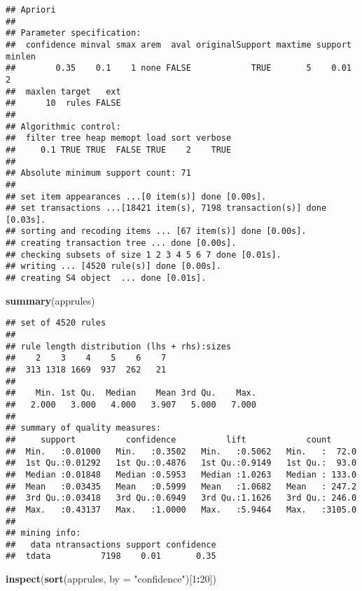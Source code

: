 \documentclass[]{article}
\newenvironment{Shaded}{\begin{snugshade}}{\end{snugshade}}
\newcommand{\KeywordTok}[1]{\textcolor[rgb]{0.13,0.29,0.53}{\textbf{#1}}}
\newcommand{\DataTypeTok}[1]{\textcolor[rgb]{0.13,0.29,0.53}{#1}}
\newcommand{\DecValTok}[1]{\textcolor[rgb]{0.00,0.00,0.81}{#1}}
\newcommand{\StringTok}[1]{\textcolor[rgb]{0.31,0.60,0.02}{#1}}
\newcommand{\OperatorTok}[1]{\textcolor[rgb]{0.81,0.36,0.00}{\textbf{#1}}}
\newcommand{\NormalTok}[1]{#1}
\begin{document}
\begin{verbatim}
## Apriori
## 
## Parameter specification:
##  confidence minval smax arem  aval originalSupport maxtime support minlen
##        0.35    0.1    1 none FALSE            TRUE       5    0.01      2
##  maxlen target   ext
##      10  rules FALSE
## 
## Algorithmic control:
##  filter tree heap memopt load sort verbose
##     0.1 TRUE TRUE  FALSE TRUE    2    TRUE
## 
## Absolute minimum support count: 71 
## 
## set item appearances ...[0 item(s)] done [0.00s].
## set transactions ...[18421 item(s), 7198 transaction(s)] done [0.03s].
## sorting and recoding items ... [67 item(s)] done [0.00s].
## creating transaction tree ... done [0.00s].
## checking subsets of size 1 2 3 4 5 6 7 done [0.01s].
## writing ... [4520 rule(s)] done [0.00s].
## creating S4 object  ... done [0.01s].
\end{verbatim}

\begin{Shaded}
\begin{Highlighting}[]
\KeywordTok{summary}\NormalTok{(apprules)}
\end{Highlighting}
\end{Shaded}

\begin{verbatim}
## set of 4520 rules
## 
## rule length distribution (lhs + rhs):sizes
##    2    3    4    5    6    7 
##  313 1318 1669  937  262   21 
## 
##    Min. 1st Qu.  Median    Mean 3rd Qu.    Max. 
##   2.000   3.000   4.000   3.907   5.000   7.000 
## 
## summary of quality measures:
##     support          confidence          lift            count       
##  Min.   :0.01000   Min.   :0.3502   Min.   :0.5062   Min.   :  72.0  
##  1st Qu.:0.01292   1st Qu.:0.4876   1st Qu.:0.9149   1st Qu.:  93.0  
##  Median :0.01848   Median :0.5953   Median :1.0263   Median : 133.0  
##  Mean   :0.03435   Mean   :0.5999   Mean   :1.0682   Mean   : 247.2  
##  3rd Qu.:0.03418   3rd Qu.:0.6949   3rd Qu.:1.1626   3rd Qu.: 246.0  
##  Max.   :0.43137   Max.   :1.0000   Max.   :5.9464   Max.   :3105.0  
## 
## mining info:
##   data ntransactions support confidence
##  tdata          7198    0.01       0.35
\end{verbatim}

\begin{Shaded}
\begin{Highlighting}[]
\KeywordTok{inspect}\NormalTok{(}\KeywordTok{sort}\NormalTok{(apprules, }\DataTypeTok{by =} \StringTok{"confidence"}\NormalTok{)[}\DecValTok{1}\OperatorTok{:}\DecValTok{20}\NormalTok{])}
\end{Highlighting}
\end{Shaded}
\end{document}
